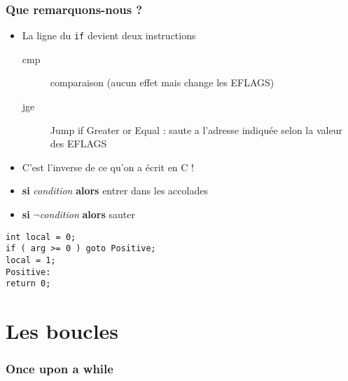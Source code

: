 \documentclass{beamer}
\begin{document}
\begin{frame}[fragile]
\frametitle{Que remarquons-nous ?}
\begin{itemize}
\item La ligne du \lstinline+if+ devient deux instructions
\begin{description} 
\item[cmp] comparaison (aucun effet mais change les EFLAGS)
\item[jge] Jump if Greater or Equal  : saute a l'adresse indiquée selon la valeur des EFLAGS
\end{description} 
\pause
\item C'est l'inverse de ce qu'on a écrit en C !
\pause
\item \textbf{si} \textit{condition} \textbf{alors} entrer dans les accolades
\item \textbf{si} $\neg$\textit{condition} \textbf{alors} sauter 
\end{itemize}


\begin{lstlisting}
int local = 0;
if ( arg >= 0 ) goto Positive;
local = 1;
Positive:
return 0;
\end{lstlisting}

\end{frame}

\section{Les boucles}
\begin{frame}
\frametitle{Once upon a while}
\end{frame}



%





\end{document}
